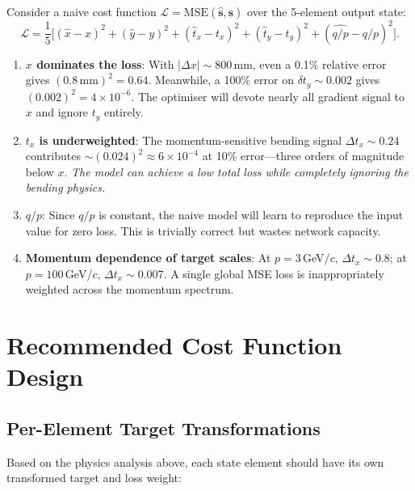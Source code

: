 \documentclass[11pt,a4paper]{article}
\begin{document}
Consider a naive cost function $\mathcal{L} = \mathrm{MSE}(\hat{\mathbf{s}},
\mathbf{s})$ over the 5-element output state:
\[
  \mathcal{L} = \frac{1}{5}\bigl[
    (\hat{x} - x)^2 + (\hat{y} - y)^2 + (\hat{t}_x - t_x)^2
    + (\hat{t}_y - t_y)^2 + (\widehat{q/p} - q/p)^2
  \bigr] .
\]
\begin{enumerate}[leftmargin=*]
  \item \textbf{$x$ dominates the loss}: With $|\Delta x| \sim 800$\,mm, even
        a 0.1\% relative error gives $(0.8\,\mathrm{mm})^2 = 0.64$.
        Meanwhile, a 100\% error on $\delta t_y \sim 0.002$ gives
        $(0.002)^2 = 4 \times 10^{-6}$.
        The optimiser will devote nearly all gradient signal to $x$
        and ignore $t_y$ entirely.
  \item \textbf{$t_x$ is underweighted}: The momentum-sensitive bending
        signal $\Delta t_x \sim 0.24$ contributes
        $\sim (0.024)^2 \approx 6 \times 10^{-4}$ at 10\% error---three
        orders of magnitude below $x$.
        \emph{The model can achieve a low total loss while completely
        ignoring the bending physics.}
  \item \textbf{$q/p$}: Since $q/p$ is constant, the naive model will
        learn to reproduce the input value for zero loss.
        This is trivially correct but wastes network capacity.
  \item \textbf{Momentum dependence of target scales}: At $p = 3$\,GeV/$c$,
        $\Delta t_x \sim 0.8$; at $p = 100$\,GeV/$c$,
        $\Delta t_x \sim 0.007$.
        A single global MSE loss is inappropriately weighted across
        the momentum spectrum.
\end{enumerate}

\section{Recommended Cost Function Design}
\label{sec:cost}

\subsection{Per-Element Target Transformations}

Based on the physics analysis above, each state element should have its
own transformed target and loss weight:
\end{document}
